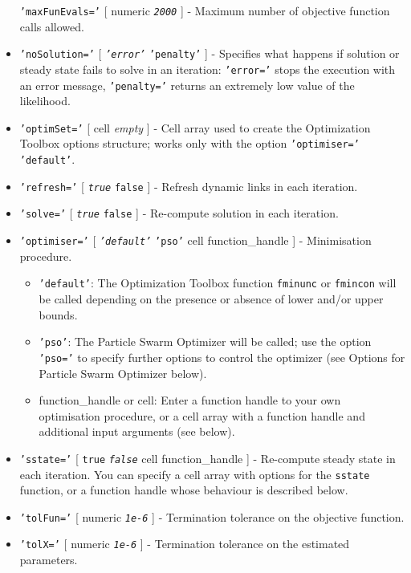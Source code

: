 \begin{itemize}
   \texttt{'maxFunEvals='} {[} numeric \textbar{} \emph{\texttt{2000}}
   {]} - Maximum number of objective function calls allowed.
 \item
   \texttt{'noSolution='} {[} \emph{\texttt{'error'}} \textbar{}
   \texttt{'penalty'} {]} - Specifies what happens if solution or steady
   state fails to solve in an iteration: \texttt{'error='} stops the
   execution with an error message, \texttt{'penalty='} returns an
   extremely low value of the likelihood.
 \item
   \texttt{'optimSet='} {[} cell \textbar{} \emph{empty} {]} - Cell array
   used to create the Optimization Toolbox options structure; works only
   with the option \texttt{'optimiser='} \texttt{'default'}.
 \item
   \texttt{'refresh='} {[} \emph{\texttt{true}} \textbar{} \texttt{false}
   {]} - Refresh dynamic links in each iteration.
 \item
   \texttt{'solve='} {[} \emph{\texttt{true}} \textbar{} \texttt{false}
   {]} - Re-compute solution in each iteration.
 \item
   \texttt{'optimiser='} {[} \emph{\texttt{'default'}} \textbar{}
   \texttt{'pso'} \textbar{} cell \textbar{} function\_handle {]} -
   Minimisation procedure.
 
   \begin{itemize}
   \item
     \texttt{'default'}: The Optimization Toolbox function
     \texttt{fminunc} or \texttt{fmincon} will be called depending on the
     presence or absence of lower and/or upper bounds.
   \item
     \texttt{'pso'}: The Particle Swarm Optimizer will be called; use the
     option \texttt{'pso='} to specify further options to control the
     optimizer (see Options for Particle Swarm Optimizer below).
   \item
     function\_handle or cell: Enter a function handle to your own
     optimisation procedure, or a cell array with a function handle and
     additional input arguments (see below).
   \end{itemize}
 \item
   \texttt{'sstate='} {[} \texttt{true} \textbar{} \emph{\texttt{false}}
   \textbar{} cell \textbar{} function\_handle {]} - Re-compute steady
   state in each iteration. You can specify a cell array with options for
   the \texttt{sstate} function, or a function handle whose behaviour is
   described below.
 \item
   \texttt{'tolFun='} {[} numeric \textbar{} \emph{\texttt{1e-6}} {]} -
   Termination tolerance on the objective function.
 \item
   \texttt{'tolX='} {[} numeric \textbar{} \emph{\texttt{1e-6}} {]} -
   Termination tolerance on the estimated parameters.
 \end{itemize}
 
